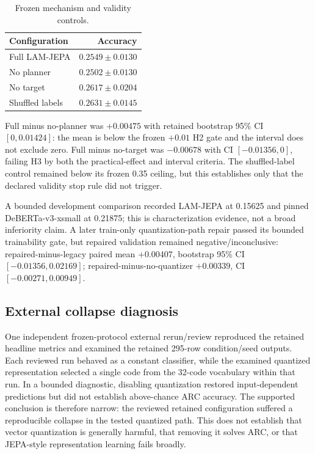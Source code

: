 \documentclass[10pt,conference]{IEEEtran}
\begin{document}
\begin{table}[t]
\centering
\caption{Frozen mechanism and validity controls.}
\label{tab:abl}
\begin{tabular}{lr}
\toprule
Configuration & Accuracy \\
\midrule
Full LAM-JEPA & $0.2549\pm0.0130$ \\
No planner & $0.2502\pm0.0130$ \\
No target & $0.2617\pm0.0204$ \\
Shuffled labels & $0.2631\pm0.0145$ \\
\bottomrule
\end{tabular}
\end{table}
Full minus no-planner was $+0.00475$ with retained bootstrap 95\% CI $[0,0.01424]$: the mean is below the frozen $+0.01$ H2 gate and the interval does not exclude zero. Full minus no-target was $-0.00678$ with CI $[-0.01356,0]$, failing H3 by both the practical-effect and interval criteria. The shuffled-label control remained below its frozen 0.35 ceiling, but this establishes only that the declared validity stop rule did not trigger.

A bounded development comparison recorded LAM-JEPA at 0.15625 and pinned DeBERTa-v3-xsmall at 0.21875; this is characterization evidence, not a broad inferiority claim. A later train-only quantization-path repair passed its bounded trainability gate, but repaired validation remained negative/inconclusive: repaired-minus-legacy paired mean $+0.00407$, bootstrap 95\% CI $[-0.01356,0.02169]$; repaired-minus-no-quantizer $+0.00339$, CI $[-0.00271,0.00949]$.

\subsection{External collapse diagnosis}
One independent frozen-protocol external rerun/review reproduced the retained headline metrics and examined the retained 295-row condition/seed outputs. Each reviewed run behaved as a constant classifier, while the examined quantized representation selected a single code from the 32-code vocabulary within that run. In a bounded diagnostic, disabling quantization restored input-dependent predictions but did not establish above-chance ARC accuracy. The supported conclusion is therefore narrow: the reviewed retained configuration suffered a reproducible collapse in the tested quantized path. This does not establish that vector quantization is generally harmful, that removing it solves ARC, or that JEPA-style representation learning fails broadly.
\end{document}
